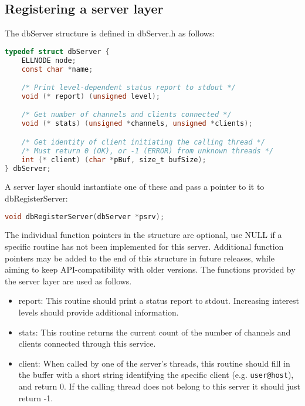 \subsection{Registering a server layer}

The dbServer structure is defined in dbServer.h as follows:

\begin{lstlisting}[language=C]
typedef struct dbServer {
    ELLNODE node;
    const char *name;

    /* Print level-dependent status report to stdout */
    void (* report) (unsigned level);

    /* Get number of channels and clients connected */
    void (* stats) (unsigned *channels, unsigned *clients);

    /* Get identity of client initiating the calling thread */
    /* Must return 0 (OK), or -1 (ERROR) from unknown threads */
    int (* client) (char *pBuf, size_t bufSize);
} dbServer;
\end{lstlisting}

A server layer should instantiate one of these and pass a pointer to it to dbRegisterServer:

\begin{lstlisting}[language=C]
void dbRegisterServer(dbServer *psrv);
\end{lstlisting}

The individual function pointers in the structure are optional, use NULL if a specific routine has not been implemented for this server.
Additional function pointers may be added to the end of this structure in future releases, while aiming to keep API-compatibility with older versions.
The functions provided by the server layer are used as follows.

\begin{itemize}

\item {}report: This routine should print a status report to stdout. Increasing interest levels should provide additional information.

\item {}stats: This routine returns the current count of the number of channels and clients connected through this service.

\item {}client: When called by one of the server's threads, this routine should fill in the buffer with a short string identifying the specific client (e.g. \verb|user@host|), and return 0. If the calling thread does not belong to this server it should just return -1.

\end{itemize}

